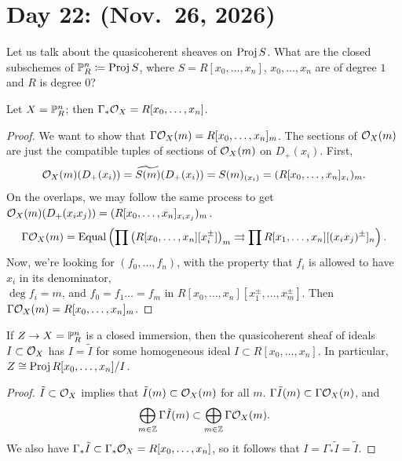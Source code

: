 \section{Day 22: (Nov.\ 26, 2026)}
Let us talk about the quasicoherent sheaves on $\operatorname{Proj} S$. What are the closed subschemes of $\mathbb P_R^n \coloneq \operatorname{Proj} S$, where $S = R[x_0, \dots, x_n]$, $x_0, \dots, x_n$ are of degree $1$ and $R$ is degree $0$?
\begin{theorem} \label{thm:sections_of_projective_space}
    Let $X = \mathbb P_R^n$; then $\Gamma_\ast \mathcal O_X = R[x_0, \dots, x_n]$.
\end{theorem}
\begin{proof}
    We want to show that $\Gamma \mathcal O_X(m) = R[x_0, \dots, x_n]_m$. The sections of $\mathcal O_X(m)$ are just the compatible tuples of sections of $\mathcal O_X(m)$ on $D_+(x_i)$. First,
    \[ \mathcal O_X(m)(D_+(x_i)) = \widetilde{S(m)}(D_+(x_i)) = S(m)_{(x_i)} = (R[x_0, \dots, x_n]_{x_i})_m. \]
    On the overlaps, we may follow the same process to get $\mathcal O_X(m)(D_+(x_i x_j)) = (R[x_0, \dots, x_n]_{x_i x_j})_m$.
    \[ \Gamma \mathcal O_X(m) = \operatorname{Equal}\left(\prod \left(R[x_0, \dots, x_n][x_i^\pm]\right)_m \rightrightarrows \prod R[x_1, \dots, x_n][(x_i x_j)^\pm]_n\right). \]
    Now, we're looking for $(f_0, \dots, f_n)$, with the property that $f_i$ is allowed to have $x_i$ in its denominator, \\ $\deg f_i = m$, and $f_0 = f_1 \dots = f_m$ in $R[x_0, \dots, x_n][x_1^\pm , \dots, x_m^\pm]$. Then $\Gamma \mathcal O_X(m) = R[x_0, \dots, x_n]_m$.
\end{proof}

\begin{theorem} \label{thm:global_proj}
    If $Z \to X = \mathbb P_R^n$ is a closed immersion, then the quasicoherent sheaf of ideals $I \subset \mathcal O_X$ has $I = \tilde I$ for some homogeneous ideal $I \subset R[x_0, \dots, x_n]$. In particular, $Z \cong \operatorname{Proj} R[x_0, \dots, x_n] / I$.
\end{theorem}
\begin{proof}
    $\tilde I \subset \mathcal O_X$ implies that $\tilde I(m) \subset \mathcal O_X(m)$ for all $m$. $\Gamma \tilde I(m) \subset \Gamma \mathcal O_X(n)$, and
    \[ \bigoplus_{m \in \mathbb Z} \Gamma \tilde I(m) \subset \bigoplus_{m \in \mathbb Z} \Gamma \mathcal O_X(m). \]
    We also have $\Gamma_\ast \tilde I \subset \Gamma_\ast \mathcal O_X = R[x_0, \dots, x_n]$, so it follows that $I = \Gamma_\ast \tilde I = \tilde I$.
\end{proof}

